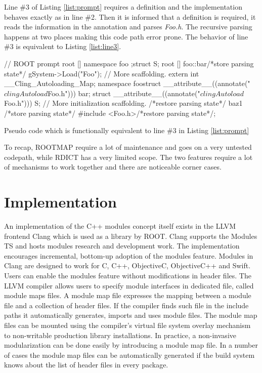 \documentclass{webofc}
\begin{document}
Line \#3 of Listing \ref{list:prompt} requires a definition and the implementation behaves exactly as in line \#2. Then it is informed that a definition is required, it reads the information in the annotation and parses {\it Foo.h}. The recursive parsing happens at two places making this code path error prone. The behavior of line \#3 is equivalent to Listing \ref{list:line3}.

\begin{listing}[h]
    \noindent
    \begin{minipage}[h]{.7\textwidth}
    \begin{cppcode*}{}
    // ROOT prompt
    root [] namespace foo { };struct S;
    root [] foo::bar/*store parsing state*/
        gSystem->Load("Foo");
        // More scaffolding.
        extern int __Cling_Autoloading_Map;
        namespace foo{struct __attribute__((annotate("$clingAutoload$Foo.h"))) bar;}
        struct __attribute__((annotate("$clingAutoload$Foo.h"))) S;
        // More initialization scaffolding.
        /*restore parsing state*/ baz1 /*store parsing state*/
        #include <Foo.h>/*restore parsing state*/;
    \end{cppcode*}
    \end{minipage}
    \caption{Pseudo code which is functionally equivalent to line \#3 in Listing \ref{list:prompt}}
    \label{list:line3}
\end{listing}

To recap, ROOTMAP require a lot of maintenance and goes on a very untested codepath, while RDICT has a very limited scope. The two features require a lot of mechanisms to work together and there are noticeable corner cases.

\section{Implementation}
\label{implementation}

An implementation of the C++ modules concept itself exists in the LLVM frontend Clang which is used as a library by ROOT. Clang supports the Modules TS and hosts modules research and development work. The implementation encourages incremental, bottom-up adoption of the modules feature. Modules in Clang are designed to work for C, C++, ObjectiveC, ObjectiveC++ and Swift. Users can enable the modules feature without modifications in header files. The LLVM compiler allows users to specify module interfaces in dedicated file, called module maps files. A module map file expresses the mapping between a module file and a collection of header files. If the compiler finds such file in the include paths it automatically generates, imports and uses module files. The module map files can be mounted using the compiler’s virtual file system overlay mechanism to non-writable production library installations. In practice, a non-invasive modularization can be done easily by introducing a module map file. In a number of cases the module map files can be automatically generated if the build system knows about the list of header files in every package.
\end{document}
